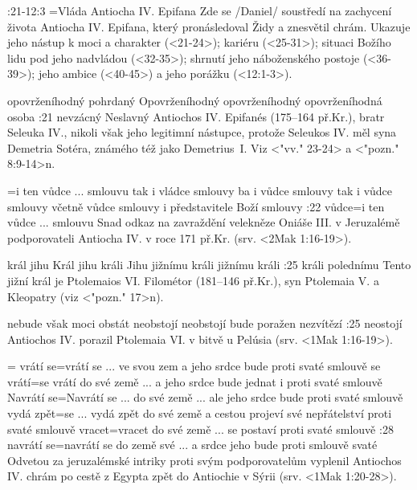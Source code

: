 :21-12:3 {}={Vláda Antiocha IV. Epifana}
        Zde se \x/Daniel/ soustředí na zachycení života Antiocha IV. Epifana, který pronásledoval Židy a znesvětil chrám. Ukazuje jeho nástup k moci a charakter (<21-24>);  kariéru
        (<25-31>); situaci Božího lidu pod jeho nadvládou (<32-35>); shrnutí jeho náboženského postoje  (<36-39>); jeho ambice  (<40-45>) a jeho porážku (<12:1-3>).

    {opovrženíhodný}  %
    {pohrdaný}   %
    {Opovrženíhodný}   %
    {opovrženíhodný}   %
    {opovrženíhodná osoba}   %
:21 {nevzácný} 
        Neslavný Antiochos IV. Epifanés (175--164 př.Kr.), bratr Seleuka IV., nikoli však jeho legitimní nástupce, protože Seleukos IV. měl syna Demetria Sotéra, známého též jako Demetrius~I. Viz <"vv." 23-24> a <"pozn." 8:9-14>n.

={i ten vůdce ...  smlouvu}   %
    {tak i vládce smlouvy}   %
    {ba i vůdce smlouvy}   %
    {tak i vůdce smlouvy}   %
    {včetně vůdce smlouvy}   %
    {i představitele Boží smlouvy}   %
:22 {vůdce}={i ten vůdce ... smlouvu} %
        Snad odkaz na zavraždění velekněze Oniáše III. v Jeruzalémě podporovateli Antiocha IV. v roce 171 př.Kr. (srv. <2Mak 1:16-19>).
        
    {král jihu}   %
    {Král jihu}   %
    {králi Jihu}   %
    {jižnímu králi}   %
    {jižnímu králi}   %
:25 {králi polednímu}
    Tento jižní král je Ptolemaios VI. Filométor (181--146 př.Kr.),  syn Ptolemaia V. a Kleopatry (viz <"pozn." 17>n).

    {nebude však moci obstát}   %
    {neobstojí}   %
    {neobstojí}   %
    {bude poražen}   %
    {nezvítězí}  %
:25 {neostojí}
    Antiochos IV. porazil Ptolemaia VI. v bitvě u Pelúsia (srv. <1Mak 1:16-19>).

={}   %
    {vrátí se}={vrátí se ... ve svou zem a jeho srdce bude proti svaté smlouvě}   %
    {se vrátí}={se vrátí do své země ... a jeho srdce bude jednat i proti svaté smlouvě}   %
    {Navrátí se}={Navrátí se ... do své země ... ale jeho srdce bude proti svaté smlouvě}   %
    {vydá zpět}={se ... vydá zpět do své země a cestou projeví své nepřátelství proti svaté smlouvě}   %
    {vracet}={vracet do své země ... se postaví proti svaté smlouvě}   %
:28 {navrátí se}={navrátí se do země své ... a srdce jeho bude proti smlouvě svaté}
    Odvetou za jeruzalémské intriky proti svým podporovatelům vyplenil Antiochos IV. chrám po cestě z Egypta zpět do  Antiochie v Sýrii (srv. <1Mak 1:20-28>). 

